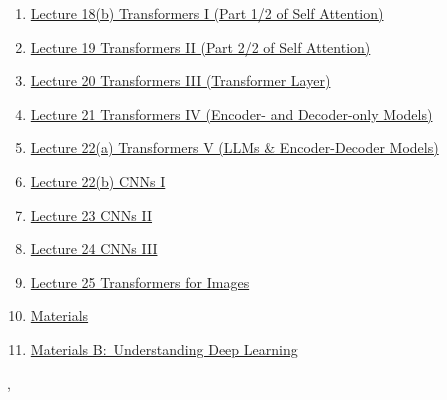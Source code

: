 \documentclass[11pt]{article}
\renewcommand{\today}{\shortmonthname[\the\month] \the \day,  \the\year}
\begin{document}
\begin{enumerate}
	\item  \href{https://mp.weixin.qq.com/s/IL_RXcSkDg1NWt92txY26A}{Lecture 18(b) Transformers I (Part 1/2 of Self Attention) } %
	\item  \href{https://mp.weixin.qq.com/s/JX6kXGq6HsAkWJb6qMG1vA}{Lecture 19 Transformers II (Part 2/2 of Self Attention)} %
	\item  \href{https://mp.weixin.qq.com/s/ugOI3plvRLfqYV1qD1fLGA}{Lecture 20 Transformers III (Transformer Layer)} %
	\item  \href{https://mp.weixin.qq.com/s/bB--SdGdnGyNJGpd07T43g}{Lecture 21 Transformers IV (Encoder- and Decoder-only Models)} %
	\item  \href{https://mp.weixin.qq.com/s/JkcRNZG2m5YRAUfp-PMvNw}{Lecture 22(a) Transformers V (LLMs \& Encoder-Decoder Models)} %
	\item  \href{https://mp.weixin.qq.com/s/POMxBTDuDojnSeA5vjyE-g}{Lecture 22(b) CNNs I} %
	\item  \href{https://mp.weixin.qq.com/s/M1JlJad9qMe-V5fniMFycQ}{Lecture 23 CNNs II} %
	\item  \href{https://mp.weixin.qq.com/s/ndRWzUxRExv3KMM7iv_AiA}{Lecture 24 CNNs III } %
	\item  \href{https://mp.weixin.qq.com/s/PFB69wkqiRxmmlwH24zfSg}{Lecture 25 Transformers for Images} %
	\item  \href{https://pan.baidu.com/s/1HrvGk0WojnH97G5atBiZXQ?pwd=1121}{Materials}
	\item  \href{https://udlbook.github.io/udlbook/}{Materials B:\ Understanding Deep Learning}
\end{enumerate}


%
\begin{flushright}
	\tiny \today 
\end{flushright}
\end{document}
